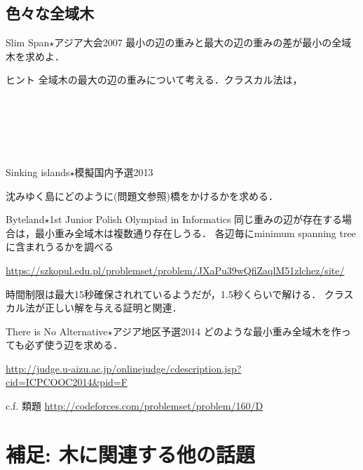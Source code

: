 \subsection{色々な全域木}

\begin{pbox}{Slim Span$\star$}{アジア大会2007}
  最小の辺の重みと最大の辺の重みの差が最小の全域木を求めよ．

\end{pbox}
\begin{tipsbox}{ヒント}
  全域木の最大の辺の重みについて考える．クラスカル法は，\textcolor{white}{
    最大の辺の重みが最小である木を出力する．そこで，最小の重みを
    $a$を全通り試しながら，重み$a$未満の辺を無視したクラスカル法の出力
    を吟味すれば良い．なお元のグラフが連結でない場合は，全域木を作れない可能性もある．クラスカル法が停止した時点で，
    disjoint setの代表元が全ての頂点で同一であることを確認すると良い．}
\end{tipsbox}

\begin{pbox}{Sinking islands$\star$}{模擬国内予選2013}

沈みゆく島にどのように(問題文参照)橋をかけるかを求める．
  
\end{pbox}


\begin{pbox}{Byteland$\star$}{1st Junior Polish Olympiad in Informatics}
同じ重みの辺が存在する場合は，最小重み全域木は複数通り存在しうる．
各辺毎にminimum spanning treeに含まれうるかを調べる

\url{https://szkopul.edu.pl/problemset/problem/JXaPu39wQfiZaqlM51zlchez/site/}
\end{pbox}

時間制限は最大15秒確保されれているようだが，1.5秒くらいで解ける．
クラスカル法が正しい解を与える証明と関連．

\begin{pbox}{There is No Alternative$\star$}{アジア地区予選2014}
どのような最小重み全域木を作っても必ず使う辺を求める．

  \url{http://judge.u-aizu.ac.jp/onlinejudge/cdescription.jsp?cid=ICPCOOC2014&pid=F}

c.f. 類題 \url{http://codeforces.com/problemset/problem/160/D}
\end{pbox}

\section{補足: 木に関連する他の話題}
